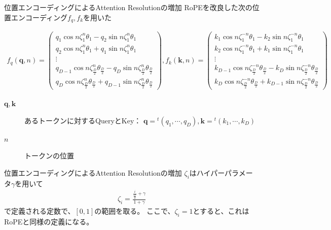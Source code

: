 \documentclass[dvipdfm, aspectratio=169]{beamer}
\def\q{\bm{q}}
\def\k{\bm{k}}
\begin{document}
    \begin{frame}{位置エンコーディングによるAttention Resolutionの増加}
        RoPEを改良した次の位置エンコーディング$f_q,f_k$を用いた
        \begin{block}{}
            {\small
            \begin{align*}
                f_q(\q,n) = \begin{pmatrix}
                    q_1\cos n\zeta^n_1\theta_1 - q_2\sin n\zeta_1^n\theta_1 \\
                    q_2\cos n\zeta^n_1\theta_1 + q_1\sin n\zeta_1^n\theta_1 \\
                    \vdots \\
                    q_{D-1}\cos n\zeta^n_{\frac{D}{2}}\theta_{\frac{D}{2}} - q_D\sin n\zeta^n_{\frac{D}{2}}\theta_{\frac{D}{2}} \\
                    q_D\cos n\zeta^n_{\frac{D}{2}}\theta_{\frac{D}{2}} + q_{D-1}\sin n\zeta^n_{\frac{D}{2}}\theta_{\frac{D}{2}}
                \end{pmatrix},f_k(\k,n) = \begin{pmatrix}
                    k_1\cos n\zeta^{-n}_1\theta_1 - k_2\sin n\zeta^{-n}_1\theta_1 \\
                    k_2\cos n\zeta^{-n}_1\theta_1 + k_1\sin n\zeta^{-n}_1\theta_1 \\
                    \vdots \\
                    k_{D-1}\cos n\zeta^{-n}_{\frac{D}{2}}\theta_{\frac{D}{2}} - k_D\sin n\zeta^{-n}_{\frac{D}{2}}\theta_{\frac{D}{2}} \\
                    k_D\cos n\zeta^{-n}_{\frac{D}{2}}\theta_{\frac{D}{2}} + k_{D-1}\sin n\zeta^{-n}_{\frac{D}{2}}\theta_{\frac{D}{2}}
                \end{pmatrix}
            \end{align*}
            }
            \begin{description}
                \item[$\q,\k$]{
                    あるトークンに対するQueryとKey：
                    $\q={}^t(q_1,\cdots,q_D), \k={}^t(k_1,\cdots,k_D)$
                }
                \item[$n$]{
                    トークンの位置
                }
            \end{description}
        \end{block}
    \end{frame}
    \begin{frame}{位置エンコーディングによるAttention Resolutionの増加}
        $\zeta_i$はハイパーパラメータ$\gamma$を用いて
        \begin{align*}
            \zeta_i = \frac{\frac{i}{\frac{D}{2}}+\gamma}{1+\gamma}
        \end{align*}
        で定義される定数で、$[0,1]$の範囲を取る。
        ここで、$\zeta_i=1$とすると、これはRoPEと同様の定義になる。
    \end{frame}
\end{document}
